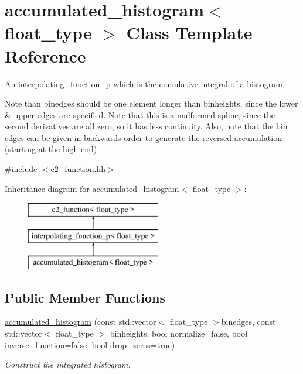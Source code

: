 \hypertarget{classaccumulated__histogram}{\section{accumulated\-\_\-histogram$<$ float\-\_\-type $>$ Class Template Reference}
\label{classaccumulated__histogram}
}


An \hyperlink{classinterpolating__function__p}{interpolating\-\_\-function\-\_\-p} which is the cumulative integral of a histogram.

Note than binedges should be one element longer than binheights, since the lower \& upper edges are specified. Note that this is a malformed spline, since the second derivatives are all zero, so it has less continuity. Also, note that the bin edges can be given in backwards order to generate the reversed accumulation (starting at the high end)  




{\ttfamily \#include $<$c2\-\_\-function.\-hh$>$}

Inheritance diagram for accumulated\-\_\-histogram$<$ float\-\_\-type $>$\-:\begin{figure}[H]
\begin{center}
\leavevmode
\includegraphics[height=3.000000cm]{classaccumulated__histogram}
\end{center}
\end{figure}
\subsection*{Public Member Functions}
\begin{DoxyCompactItemize}
\item 
\hyperlink{classaccumulated__histogram_a54f0bb356a90baa58ff635ef8094dfc8}{accumulated\-\_\-histogram} (const std\-::vector$<$ float\-\_\-type $>$binedges, const std\-::vector$<$ float\-\_\-type $>$ binheights, bool normalize=false, bool inverse\-\_\-function=false, bool drop\-\_\-zeros=true)
\begin{DoxyCompactList}\small\item\em Construct the integrated histogram. \end{DoxyCompactList}\end{DoxyCompactItemize}

